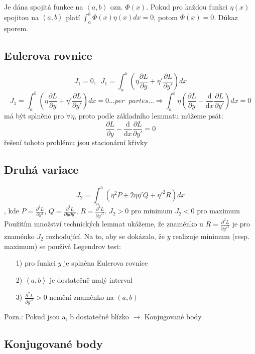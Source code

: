 \documentclass[a4]{report}
\theoremstyle{definition}
\begin{document}
{Je dána spojitá funkce na $\left \langle a,b \right \rangle$ ozn. $\Phi (x)$. Pokud pro každou funkci $\eta (x)$ spojitou na $\left \langle a,b \right \rangle$ platí $\int_{a}^{b}\Phi (x)\eta (x)dx=0$, potom $\Phi (x)=0$.
 Důkaz sporem.

\subsection{Eulerova rovnice}
$$J_{1}=0,\; \; J_{1}=\int_{a}^{b}(\eta\frac{\partial L}{\partial y} +{\eta }'\frac{\partial L}{\partial {y}'})dx$$
$$J_{1}=\int_{a}^{b}(\eta\frac{\partial L}{\partial y} +{\eta }'\frac{\partial L}{\partial {y}'})dx=0...per\; \; partes...\Rightarrow \int_{a}^{b}\eta (\frac{\partial L}{\partial y}-\frac{\mathrm{d} }{\mathrm{d} x}\frac{\partial L}{\partial {y}'})dx=0$$
má být splněno pro $\forall \eta $, proto podle základního lemmatu můžeme psát:
$$\frac{\partial L}{\partial y}-\frac{\mathrm{d} }{\mathrm{d} x}\frac{\partial L}{\partial {y}'}=0$$
řešení tohoto problému jsou stacionární křivky


\subsection{Druhá variace}

$$J_{2}=\int_{a}^{b}(\eta ^{2}P+2\eta {\eta }'Q+{\eta }'^{2}R)dx$$
, kde $P=\frac{\partial^2 L}{\partial y^2} $, $Q=\frac{\partial^2 L}{\partial y\partial {y}'} $, $R=\frac{\partial^2 L}{\partial {y}'^2} $. 
\newline $J_{2}> 0$ pro minimum 
\newline $J_{2}< 0$ pro maximum
\newline Použitím množství technických lemmat ukážeme, že znaménko u $R=\frac{\partial^2 L}{\partial {y}'^2} $ je pro znaménko $J_{2}$ rozhodující.
Na to, aby se dokázalo, že $y$ realizuje minimum (resp. maximum) se používá Legendrov test: 
  \begin{enumerate}
\item[1)] pro funkci $y$ je splněna Eulerova rovnice
\item[2)] $\left \langle a,b \right \rangle$ je dostatečně malý interval
\item[3)] $\frac{\partial^2 L}{\partial {y}'^2}>0$ nemění znaménko na $(a,b)$

\end{enumerate}
Pozn.: Pokud jsou a, b dostatečně blízko $\rightarrow$ Konjugované body

\subsection{Konjugované body}

}
\end{document}

